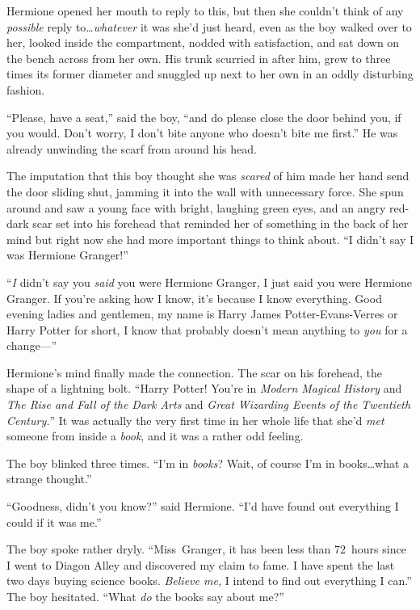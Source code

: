 Hermione opened her mouth to reply to this, but then she couldn’t think of any \emph{possible} reply to…\emph{whatever} it was she’d just heard, even as the boy walked over to her, looked inside the compartment, nodded with satisfaction, and sat down on the bench across from her own. His trunk scurried in after him, grew to three times its former diameter and snuggled up next to her own in an oddly disturbing fashion.

“Please, have a seat,” said the boy, “and do please close the door behind you, if you would. Don’t worry, I don’t bite anyone who doesn’t bite me first.” He was already unwinding the scarf from around his head.

The imputation that this boy thought she was \emph{scared} of him made her hand send the door sliding shut, jamming it into the wall with unnecessary force. She spun around and saw a young face with bright, laughing green eyes, and an angry red-dark scar set into his forehead that reminded her of something in the back of her mind but right now she had more important things to think about. “I didn’t say I was Hermione Granger!”

“\emph{I} didn’t say you \emph{said} you were Hermione Granger, I just said you were Hermione Granger. If you’re asking how I know, it’s because I know everything. Good evening ladies and gentlemen, my name is Harry James Potter-Evans-Verres or Harry Potter for short, I know that probably doesn’t mean anything to \emph{you} for a change—”

Hermione’s mind finally made the connection. The scar on his forehead, the shape of a lightning bolt. “Harry Potter! You’re in \emph{Modern Magical History} and \emph{The Rise and Fall of the Dark Arts} and \emph{Great Wizarding Events of the Twentieth Century.}” It was actually the very first time in her whole life that she’d \emph{met} someone from inside a \emph{book}, and it was a rather odd feeling.

The boy blinked three times. “I’m in \emph{books}? Wait, of course I’m in books…what a strange thought.”

“Goodness, didn’t you know?” said Hermione. “I’d have found out everything I could if it was me.”

The boy spoke rather dryly. “Miss~Granger, it has been less than 72~hours since I went to Diagon Alley and discovered my claim to fame. I have spent the last two days buying science books. \emph{Believe me,} I intend to find out everything I can.” The boy hesitated. “What \emph{do} the books say about me?”

